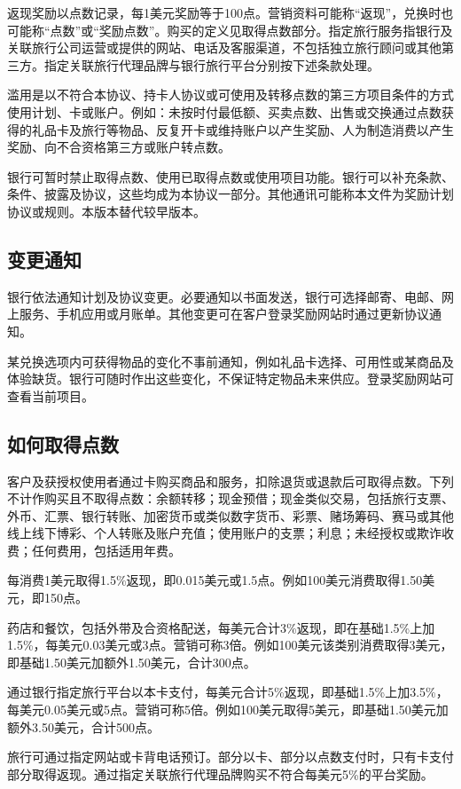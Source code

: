 \documentclass[UTF8,fontset=none,11pt,a4paper]{ctexart}
\begin{document}
返现奖励以点数记录，每1美元奖励等于100点。营销资料可能称“返现”，兑换时也可能称“点数”或“奖励点数”。购买的定义见取得点数部分。指定旅行服务指银行及关联旅行公司运营或提供的网站、电话及客服渠道，不包括独立旅行顾问或其他第三方。指定关联旅行代理品牌与银行旅行平台分别按下述条款处理。


滥用是以不符合本协议、持卡人协议或可使用及转移点数的第三方项目条件的方式使用计划、卡或账户。例如：未按时付最低额、买卖点数、出售或交换通过点数获得的礼品卡及旅行等物品、反复开卡或维持账户以产生奖励、人为制造消费以产生奖励、向不合资格第三方或账户转点数。


银行可暂时禁止取得点数、使用已取得点数或使用项目功能。银行可以补充条款、条件、披露及协议，这些均成为本协议一部分。其他通讯可能称本文件为奖励计划协议或规则。本版本替代较早版本。


\subsection*{变更通知}
银行依法通知计划及协议变更。必要通知以书面发送，银行可选择邮寄、电邮、网上服务、手机应用或月账单。其他变更可在客户登录奖励网站时通过更新协议通知。


某兑换选项内可获得物品的变化不事前通知，例如礼品卡选择、可用性或某商品及体验缺货。银行可随时作出这些变化，不保证特定物品未来供应。登录奖励网站可查看当前项目。


\subsection*{如何取得点数}
客户及获授权使用者通过卡购买商品和服务，扣除退货或退款后可取得点数。下列不计作购买且不取得点数：余额转移；现金预借；现金类似交易，包括旅行支票、外币、汇票、银行转账、加密货币或类似数字货币、彩票、赌场筹码、赛马或其他线上线下博彩、个人转账及账户充值；使用账户的支票；利息；未经授权或欺诈收费；任何费用，包括适用年费。


每消费1美元取得1.5\%返现，即0.015美元或1.5点。例如100美元消费取得1.50美元，即150点。


药店和餐饮，包括外带及合资格配送，每美元合计3\%返现，即在基础1.5\%上加1.5\%，每美元0.03美元或3点。营销可称3倍。例如100美元该类别消费取得3美元，即基础1.50美元加额外1.50美元，合计300点。


通过银行指定旅行平台以本卡支付，每美元合计5\%返现，即基础1.5\%上加3.5\%，每美元0.05美元或5点。营销可称5倍。例如100美元取得5美元，即基础1.50美元加额外3.50美元，合计500点。


旅行可通过指定网站或卡背电话预订。部分以卡、部分以点数支付时，只有卡支付部分取得返现。通过指定关联旅行代理品牌购买不符合每美元5\%的平台奖励。
\end{document}
